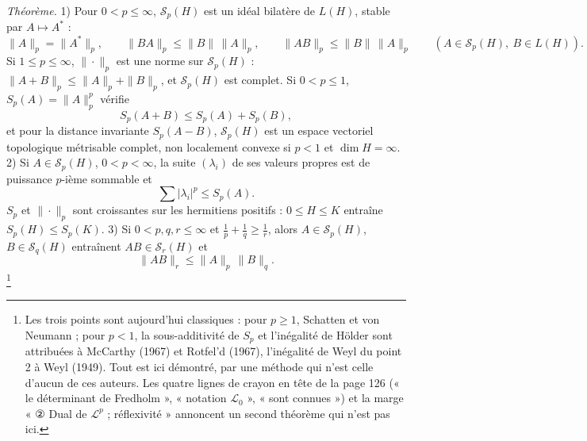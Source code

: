 \documentclass[11pt,a4paper]{article}
\begin{document}
\emph{Théorème.} 1) Pour $0 < p \leq \infty$, $\mathcal{S}_p(H)$ est un idéal
bilatère de $L(H)$, stable par $A \mapsto A^{*}$ :
\[
  \|A\|_p = \|A^{*}\|_p, \qquad \|BA\|_p \leq \|B\|\,\|A\|_p, \qquad
  \|AB\|_p \leq \|B\|\,\|A\|_p \qquad (A \in \mathcal{S}_p(H),\ B \in L(H)) .
\]
Si $1 \leq p \leq \infty$, $\|\cdot\|_p$ est une norme sur $\mathcal{S}_p(H)$ :
$\|A + B\|_p \leq \|A\|_p + \|B\|_p$, et $\mathcal{S}_p(H)$ est complet. Si
$0 < p \leq 1$, $S_p(A) = \|A\|_p^p$ vérifie
\[
  S_p(A + B) \leq S_p(A) + S_p(B),
\]
et pour la distance invariante $S_p(A - B)$, $\mathcal{S}_p(H)$ est un espace
vectoriel topologique métrisable complet, non localement convexe si $p < 1$
et $\dim H = \infty$.
2) Si $A \in \mathcal{S}_p(H)$, $0 < p < \infty$, la suite $(\lambda_i)$ de
ses valeurs propres est de puissance $p$-ième sommable et
\[
  \sum |\lambda_i|^p \leq S_p(A) .
\]
$S_p$ et $\|\cdot\|_p$ sont croissantes sur les hermitiens positifs : $0 \leq
H \leq K$ entraîne $S_p(H) \leq S_p(K)$.
3) Si $0 < p, q, r \leq \infty$ et $\frac1p + \frac1q \geq \frac1r$, alors
$A \in \mathcal{S}_p(H)$, $B \in \mathcal{S}_q(H)$ entraînent $AB \in
\mathcal{S}_r(H)$ et
\[
  \|AB\|_r \leq \|A\|_p\,\|B\|_q .
\]
\footnote{Les trois points sont aujourd'hui classiques : pour $p \geq 1$,
Schatten et von Neumann ; pour $p < 1$, la sous-additivité de $S_p$ et
l'inégalité de Hölder sont attribuées à McCarthy (1967) et Rotfel'd (1967),
l'inégalité de Weyl du point 2 à Weyl (1949). Tout est ici démontré, par
une méthode qui n'est celle d'aucun de ces auteurs. Les quatre lignes de
crayon en tête de la page 126 (« le déterminant de Fredholm »,
« notation $\mathcal{L}_0$ », « sont connues ») et la marge « ② Dual de
$\mathcal{L}^p$ ; réflexivité » annoncent un second théorème qui n'est pas
ici.}
\end{document}
